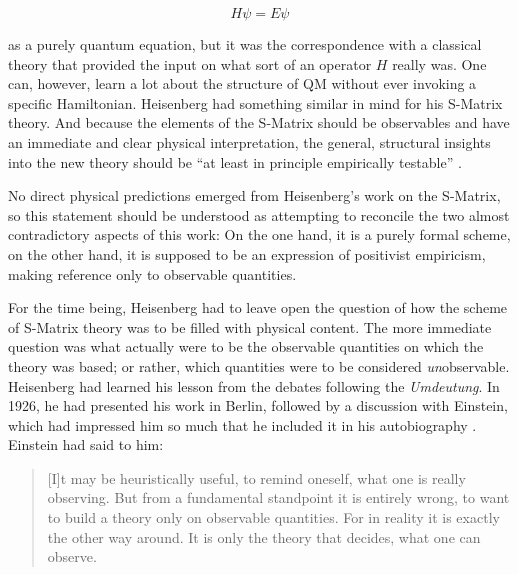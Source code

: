 \documentclass[12pt,a4paper]{article}
\begin{document}
\begin{equation}
H \psi = E \psi
\end{equation}

as a purely quantum equation, but it was the correspondence with a classical theory that provided the input on what sort of an operator $H$ really was. One can, however, learn a lot about the structure of QM without ever invoking a specific Hamiltonian. Heisenberg had something similar in mind for his S-Matrix theory. And because the elements of the S-Matrix should be observables and have an immediate and clear physical interpretation, the general, structural insights into the new theory should be ``at least in principle empirically testable'' \citep[p.514]{heisenberg_1943_die-beobachtbaren}.

No direct physical predictions emerged from Heisenberg's work on the S-Matrix, so this statement should be understood as attempting to reconcile the two almost contradictory aspects of this work: On the one hand, it is a purely formal scheme, on the other hand, it is supposed to be an expression of positivist empiricism, making reference only to observable quantities.

For the time being, Heisenberg had to leave open the question of how the scheme of S-Matrix theory was to be filled with physical content. The more immediate question was what actually were to be the observable quantities on which the theory was based; or rather, which quantities were to be considered \emph{un}observable. Heisenberg had learned his lesson from the debates following the \emph{Umdeutung}. In 1926, he had presented his work in Berlin, followed by a discussion with Einstein, which had impressed him so much that he included it in his autobiography \citep{heisenberg_1969_der-teil}. Einstein had said to him:

\begin{quote}
[I]t may be heuristically useful, to remind oneself, what one is really observing. But from a fundamental standpoint it is entirely wrong, to want to build a theory only on observable quantities. For in reality it is exactly the other way around. It is only the theory that decides, what one can observe.
\end{quote}
\end{document}
